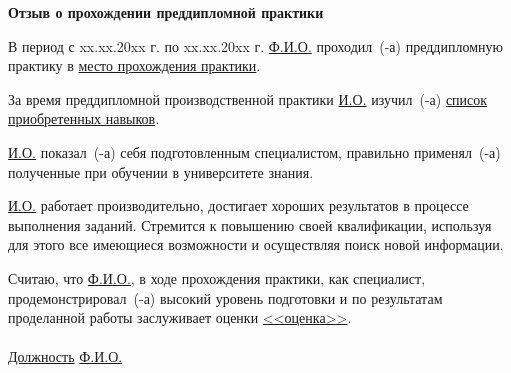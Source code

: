 \documentclass[a4paper, 14pt, oneside, DIV]{scrartcl}
\begin{document}
    \noindent{}

    \begin{center}
        \textbf{Отзыв о прохождении преддипломной практики}
    \end{center}

    В период с xx.xx.20xx г. по xx.xx.20xx г. \underline{Ф.И.О.} проходил~(-а) преддипломную практику в \underline{место прохождения практики}.

    За время преддипломной производственной практики \underline{И.О.} изучил~(-а) \underline{список} \underline{приобретенных навыков}.

    \underline{И.О.} показал~(-а) себя подготовленным специалистом, правильно применял~(-а) полученные при обучении в университете знания.

    \underline{И.О.} работает производительно, достигает хороших результатов в процессе выполнения заданий. Стремится к повышению своей квалификации, используя для этого все имеющиеся возможности и осуществляя поиск новой информации.

    Считаю, что \underline{Ф.И.О.}, в ходе прохождения практики, как специалист, продемонстрировал~(-а) высокий уровень подготовки и по результатам проделанной работы заслуживает оценки \underline{<<оценка>>}.
    \\\\

    \noindent \hspace{15mm} \underline{Должность} \hspace{100mm} \underline{Ф.И.О.}
\end{document}
